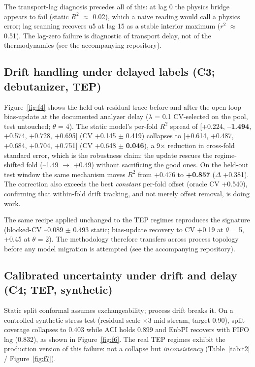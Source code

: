 The transport-lag diagnosis precedes all of this: at lag 0 the physics bridge appears
to fail (static $R^2$ $\approx$ 0.02), which a naive reading would call a physics error; lag
scanning recovers u5 at lag 15 as a stable interior maximum ($r^2$ $\approx$ 0.51). The lag-zero
failure is diagnostic of transport delay, not of the thermodynamics (see the accompanying repository).

\subsection{Drift handling under delayed labels (C3; debutanizer, TEP)}

Figure~\ref{fig:f4} shows the held-out residual trace before and after the open-loop bias-update
\citep{shardt2016} at the documented analyzer delay ($\lambda$ = 0.1 CV-selected on the pool, test
untouched; $\theta$ = 4). The static model's per-fold $R^2$ spread of {[}+0.224, \textbf{--1.494},
+0.574, +0.728, +0.695{]} (CV +0.145 $\pm$ 0.419) collapses to {[}+0.614, +0.487, +0.684,
+0.704, +0.751{]} (CV +0.648 $\pm$ \textbf{0.046}), a 9$\times$ reduction in cross-fold standard error,
which is the robustness claim: the update rescues the regime-shifted fold (--1.49 $\to$
+0.49) without sacrificing the good ones. On the held-out test window the same
mechanism moves $R^2$ from +0.476 to \textbf{+0.857} ($\Delta$ +0.381). The correction also exceeds
the best \emph{constant} per-fold offset (oracle CV +0.540), confirming that within-fold
drift tracking, and not merely offset removal, is doing work.

The same recipe applied unchanged to the TEP regimes reproduces the signature
(blocked-CV --0.089 $\pm$ 0.493 static; bias-update recovery to CV +0.19 at $\theta$ = 5, +0.45 at
$\theta$ = 2). The methodology therefore transfers across process topology before any model migration
is attempted (see the accompanying repository).

\subsection{Calibrated uncertainty under drift and delay (C4; TEP, synthetic)}

Static split conformal \citep{papadopoulos2002} assumes exchangeability; process drift
breaks it. On a controlled synthetic stress test (residual scale $\times$3 mid-stream, target
0.90), split coverage collapses to 0.403 while ACI \citep{gibbs2021aci} holds 0.899
and EnbPI \citep{xu2021enbpi} recovers with FIFO lag (0.832), as shown in Figure~\ref{fig:f6}. The real TEP
regimes exhibit the production version of this failure: not a collapse but
\emph{inconsistency} (Table~\ref{tab:t2} / Figure~\ref{fig:f7}).


